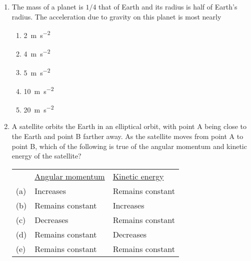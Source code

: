 \documentclass{../../oss-apphys}
\begin{document}
\begin{multicols}{2}
\begin{enumerate}[leftmargin=18pt]
  \item The mass of a planet is $1/4$ that of Earth and its radius is half of
    Earth's radius. The acceleration due to gravity on this planet is most
    nearly
    \begin{enumerate}[noitemsep,topsep=0pt,leftmargin=18pt,label=(\Alph*)]
    \item\SI{2 }{\metre\per\second^2}
    \item\SI{4 }{\metre\per\second^2}
    \item\SI{5 }{\metre\per\second^2}
    \item\SI{10}{\metre\per\second^2}
    \item\SI{20}{\metre\per\second^2}
    \end{enumerate}
  
  \item A satellite orbits the Earth in an elliptical orbit, with point A being
    close to the Earth and point B farther away. As the satellite moves from
    point A to point B, which of the following is true of the angular momentum
    and kinetic energy of the satellite?
    \begin{center}
      \vspace{-.1in}
    \end{center}
  
    \begin{tabular}{lll}
      & \underline{Angular momentum} & \underline{Kinetic energy}\\
      (a) & Increases & Remains constant \\
      (b) & Remains constant & Increases \\
      (c) & Decreases & Remains constant \\
      (d) & Remains constant & Decreases \\
      (e) & Remains constant & Remains constant
    \end{tabular}

    \columnbreak
    

\end{enumerate}
\end{multicols}
\end{document}
